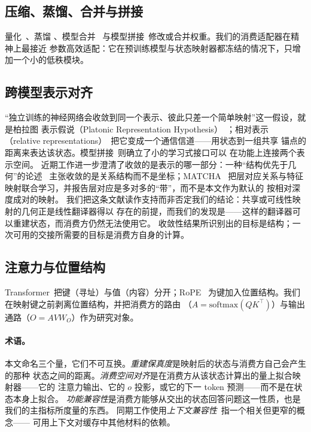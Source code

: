 \documentclass[11pt]{article}
\begin{document}
\subsection{压缩、蒸馏、合并与拼接}
\label{sec:rw-merge}
量化~\cite{frantar2023gptq,dettmers2024qlora}、蒸馏
\cite{hinton2015distilling,touvron2023llama}、模型合并~\cite{ties2023merging,dare2024icml}
与模型拼接~\cite{bansal2021stitching}修改或合并权重。我们的消费适配器在精神上最接近
参数高效适配：它在预训练模型与状态映射器都冻结的情况下，只增加一个小的低秩模块。

\subsection{跨模型表示对齐}
\label{sec:rw-align}
“独立训练的神经网络会收敛到同一个表示、彼此只差一个简单映射”这一假设，就是柏拉图
表示假说（Platonic Representation Hypothesis）~\cite{prh2024}；相对表示
（relative representations）~\cite{relrepr2022}把它变成一个通信信道——用状态到一组共享
锚点的距离来表达该状态。模型拼接~\cite{bansal2021stitching}则确立了小的学习式接口可以
在功能上连接两个表示空间。
近期工作进一步澄清了收敛的是表示的哪一部分：一种“结构优先于几何”的论述
~\cite{structuregeo2026}主张收敛的是关系结构而不是坐标；MATCHA~\cite{matcha2026}
把层对应关系与特征映射联合学习，并报告层对应是多对多的“带”，而不是本文作为默认的
按相对深度成对的映射。
我们把这条文献读作支持而非否定我们的结论：共享或可线性映射的几何正是线性翻译器得以
存在的前提，而我们的发现是——这样的翻译器可以重建状态，而消费方仍然无法使用它。
收敛性结果所识别出的目标是结构；一次可用的交接所需要的目标是消费方自身的计算。

\subsection{注意力与位置结构}
\label{sec:rw-attn}
Transformer~\cite{vaswani2017attention}把键（寻址）与值（内容）分开；RoPE~\cite{su2024rope}
为键加入位置结构。我们在映射键之前剥离位置结构，并把消费方的路由
（$A=\mathrm{softmax}(QK^{\top})$）与输出通路（$O=AVW_O$）作为研究对象。

\paragraph{术语。}
本文命名三个量，它们不可互换。\emph{重建保真度}是映射后的状态与消费方自己会产生的那种
状态之间的距离。\emph{消费空间对齐}是在消费方从该状态计算出的量上拟合映射器——它的
注意力输出、它的 $o$ 投影，或它的下一 token 预测——而不是在状态本身上拟合。
\emph{功能兼容性}是消费方能够从交出的状态回答问题这一性质，也是我们的主指标所度量的东西。
同期工作使用\emph{上下文兼容性}~\cite{repairbudget2026}指一个相关但更窄的概念——
可用上下文对缓存中其他材料的依赖。
\end{document}
